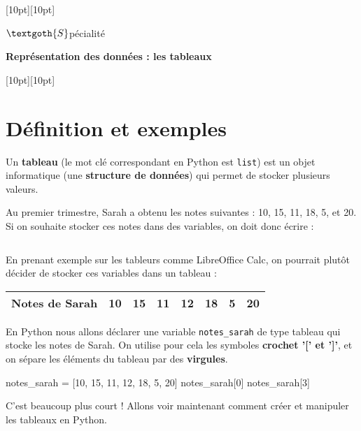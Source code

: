 \documentclass[12pt]{article}                   %
\newcommand{\disclamer}{\textit{L’usage de toute calculatrice, téléphone portable, ordinateur est strictement interdit. Un soin tout particulier devra être porté à la qualité et à la précision de la rédaction des argument } \vspace{1.cm}}
\newcommand{\legendeexos}{
\paragraph{Légende des exercices.}
\begin{center}
\begin{tabular}{cccc}
$\clubsuit$ : très flacile & $\varheart$ : à savoir par cœur & $\vardiamond$ : care aux calculs & $\spadesuit$ : qui s'y frotte s'y pique 
\end{tabular}
\end{center}
}
\theoremstyle{exercicestyle}
\theoremstyle{break2}
\theoremstyle{break3}
\begin{document}
\noindent\hrulefill
\raisebox{-2.1pt}[10pt][10pt]{\quad\decoone\quad}\hrulefill 

\hfill $\textgoth{S}$pécialité
 \begin{center}{\quad \large{\textbf{ Représentation des données : les tableaux}}\; }\end{center}
\vspace{0.5cm}
\noindent
\hrulefill
\raisebox{-16.4pt}[10pt][10pt]{}\hrulefill
\vspace{1cm}


\section{Définition et exemples}

\begin{definition}
Un \textbf{tableau} (le mot clé correspondant en Python est \texttt{list}) est un objet informatique (une \textbf{structure de données}) qui permet de stocker plusieurs valeurs.  
\end{definition} 

\begin{exemple}
    \label{ex:tableau_init}
 Au premier trimestre, Sarah a obtenu les notes suivantes : 10, 15, 11, 18, 5, et 20. Si on souhaite stocker ces notes dans des variables, on doit donc écrire :
\inputminted[frame=single, framesep=2mm, label=Code Source,linenos=true]{python}{./pyfiles/notes.py}
En prenant exemple sur les tableurs comme LibreOffice Calc, on pourrait plutôt décider de stocker ces variables dans un tableau :
\begin{center}
\begin{tabular}{|M{3cm}|c|c|c|c|c|c|c|}
    \hline
    Notes de Sarah & 10 & 15 & 11 & 12 & 18 & 5 & 20 \\
    \hline
\end{tabular}
\end{center}

En Python nous allons déclarer une variable \texttt{notes\_sarah} de type tableau qui stocke les notes de Sarah. On utilise pour cela les symboles \textbf{crochet '[' et ']'}, et on sépare les éléments du tableau par des \textbf{virgules}.

\begin{pyconsole}[][frame=single, framesep=2mm, label=Console Python,linenos=true]
notes_sarah = [10, 15, 11, 12, 18, 5, 20]
notes_sarah[0]
notes_sarah[3]
\end{pyconsole}

C'est beaucoup plus court ! Allons voir maintenant comment créer et manipuler les tableaux en Python.
\end{exemple}
\end{document}
